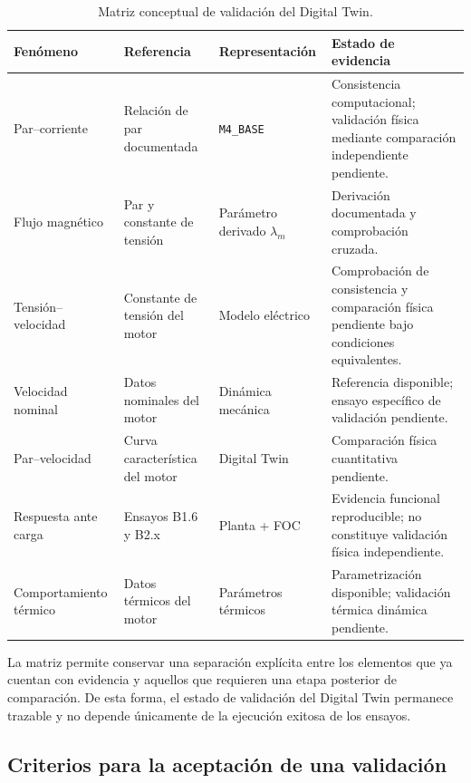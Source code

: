 \begin{table}[H]
\centering
\caption{Matriz conceptual de validación del Digital Twin.}
\label{tab:matriz_validacion}
\begin{tabular}{p{}p{}p{}p{}}
\toprule
\textbf{Fenómeno} &
\textbf{Referencia} &
\textbf{Representación} &
\textbf{Estado de evidencia} \\
\midrule

Par--corriente &
Relación de par documentada &
\texttt{M4\_BASE} &
Consistencia computacional; validación física mediante comparación independiente pendiente. \\

Flujo magnético &
Par y constante de tensión &
Parámetro derivado \(\lambda_m\) &
Derivación documentada y comprobación cruzada. \\

Tensión--velocidad &
Constante de tensión del motor &
Modelo eléctrico &
Comprobación de consistencia y comparación física pendiente bajo condiciones equivalentes. \\

Velocidad nominal &
Datos nominales del motor &
Dinámica mecánica &
Referencia disponible; ensayo específico de validación pendiente. \\

Par--velocidad &
Curva característica del motor &
Digital Twin &
Comparación física cuantitativa pendiente. \\

Respuesta ante carga &
Ensayos B1.6 y B2.x &
Planta + FOC &
Evidencia funcional reproducible; no constituye validación física independiente. \\

Comportamiento térmico &
Datos térmicos del motor &
Parámetros térmicos &
Parametrización disponible; validación térmica dinámica pendiente. \\

\bottomrule
\end{tabular}
\end{table}

La matriz permite conservar una separación explícita entre los elementos que ya cuentan con evidencia y aquellos que requieren una etapa posterior de comparación. De esta forma, el estado de validación del Digital Twin permanece trazable y no depende únicamente de la ejecución exitosa de los ensayos.

\subsection{Criterios para la aceptación de una validación}

